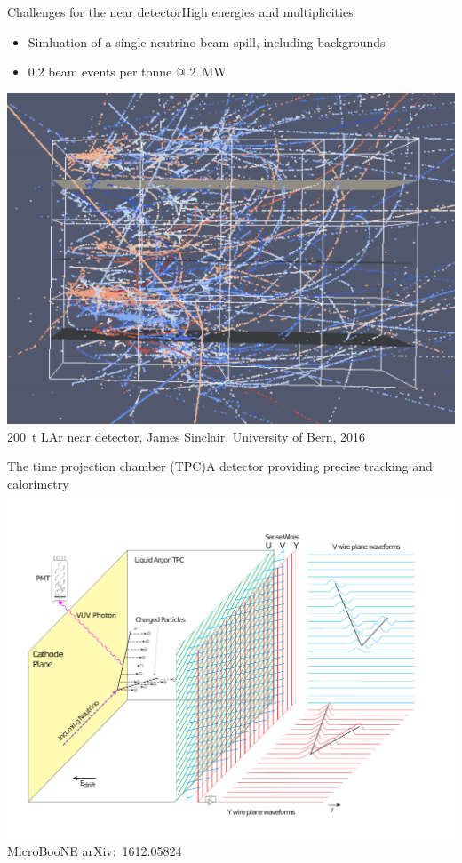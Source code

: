 \documentclass[]{beamer}
\newcommand*{\emphcol}{blue}
\newcommand*{\uboone}{{MicroBooNE}}
\begin{document}
\begin{frame}{Challenges for the near detector}{High energies and multiplicities}
	\begin{itemize}
		\item Simluation of a single neutrino beam spill, including backgrounds
		\item {\color{\emphcol} \num{0.2} beam events per tonne @ \SI{2}{\mega\watt}}
	\end{itemize}
	\centering
	\includegraphics[height=.6\textheight]{defence/dune_nd_pile-up}\\
	{\tiny \SI{200}{\tonne} LAr near detector, James Sinclair, University of Bern, 2016}\\
\end{frame}

\begin{frame}{The time projection chamber (TPC)}{A detector providing precise tracking and calorimetry}
	\centering
	\includegraphics[viewport=35 40 720 540, clip, height=.66\textheight]{defence/TPCprinciple}\\
	{\tiny \uboone{} arXiv:~1612.05824~\cite{uboone}}\\
\end{frame}
\end{document}
